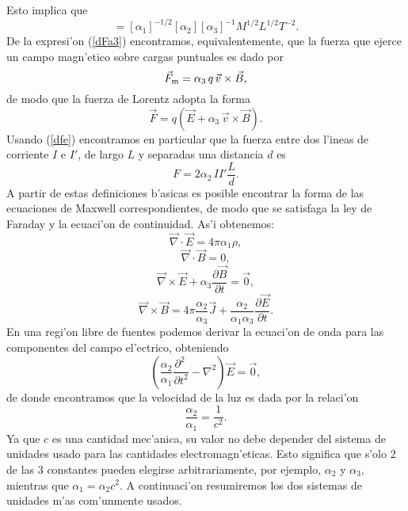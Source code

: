 Esto implica que
\begin{equation}
[B]=[\alpha_1]^{-1/2}[\alpha_2][\alpha_3]^{-1}M^{1/2}L^{1/2}T^{-2}.
\end{equation}
De la expresi'on (\ref{dFa3}) encontramos, equivalentemente, que la fuerza que ejerce un campo magn'etico sobre cargas puntuales es dado por
\begin{equation}
\vec{F}_{\rm m}=\alpha_3\, q\,\vec{v}\times\vec{B},
\end{equation} 
de modo que la fuerza de Lorentz adopta la forma
\begin{equation}
 \vec{F}=q\left(\vec{E}+\alpha_3\,\vec{v}\times\vec{B}\right).
\end{equation} 
Usando (\ref{dfe}) encontramos en particular que la fuerza entre dos l'ineas de corriente $I$ e $I'$, de largo $L$ y separadas una distancia $d$ es
\begin{equation}
 F=2\alpha_2\,II' \frac{L}{d}.
\end{equation} 
A partir de estas definiciones b'asicas es posible encontrar la forma de las ecuaciones de Maxwell correspondientes, de modo que se satisfaga la ley de Faraday y la ecuaci'on de continuidad. As'i obtenemos:
\begin{equation}
 \vec{\nabla}\cdot\vec{E}=4\pi\alpha_1\rho,
\end{equation} 
\begin{equation}
 \vec{\nabla}\cdot\vec{B}=0,
\end{equation} 
\begin{equation}
 \vec{\nabla}\times\vec{E}+\alpha_3\frac{\partial\vec{B}}{\partial t}=\vec{0},
\end{equation} 
\begin{equation}
 \vec{\nabla}\times\vec{B}=4\pi\frac{\alpha_2}{\alpha_3}\vec{J}+\frac{\alpha_2}{\alpha_1\alpha_3}\frac{
\partial\vec{E}}{\partial t}.
\end{equation} 
En una regi'on libre de fuentes podemos derivar la ecuaci'on de onda para las componentes del campo el'ectrico, obteniendo
\begin{equation}
 \left(\frac{\alpha_2}{\alpha_1}\frac{\partial^2\
}{\partial t^2}-\nabla^2\right)\vec{E} =\vec {0},
\end{equation}
de donde encontramos que la velocidad de la luz es dada por la relaci'on
 \begin{equation}
\frac{\alpha_2}{\alpha_1}=\frac{1}{c^2}.
 \end{equation} 
Ya que $c$ es una cantidad mec'anica, su valor no debe depender del sistema de unidades usado para las cantidades electromagn'eticas. Esto significa que s'olo 2 de las 3 constantes pueden elegirse arbitrariamente, por ejemplo, $\alpha_2$ y $\alpha_3$, mientras que $\alpha_1=\alpha_2c^2$. A continuaci'on resumiremos los dos sistemas de unidades m'as com'unmente usados.

